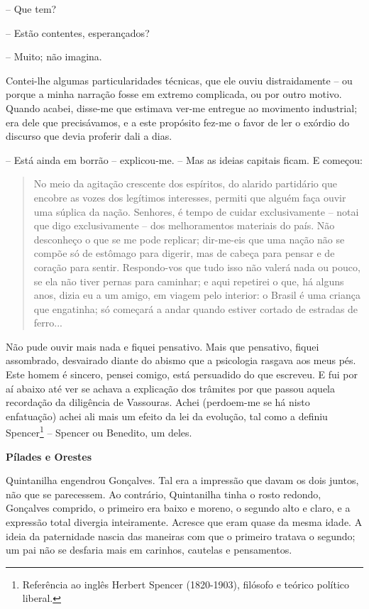 -- Que tem?

-- Estão contentes, esperançados?

-- Muito; não imagina.

Contei-lhe algumas particularidades técnicas, que ele ouviu
distraidamente -- ou porque a minha narração fosse em extremo
complicada, ou por outro motivo. Quando acabei, disse-me que estimava
ver-me entregue ao movimento industrial; era dele que precisávamos, e a
este propósito fez-me o favor de ler o exórdio do discurso que devia
proferir dali a dias.

-- Está ainda em borrão -- explicou-me. -- Mas as ideias capitais ficam.
E começou:

\begin{quote}
No meio da agitação crescente dos espíritos, do alarido partidário que
encobre as vozes dos legítimos interesses, permiti que alguém faça ouvir
uma súplica da nação. Senhores, é tempo de cuidar exclusivamente --
notai que digo exclusivamente -- dos melhoramentos materiais do país.
Não desconheço o que se me pode replicar; dir-me-eis que uma nação não
se compõe só de estômago para digerir, mas de cabeça para pensar e de
coração para sentir. Respondo-vos que tudo isso não valerá nada ou
pouco, se ela não tiver pernas para caminhar; e aqui repetirei o que, há
alguns anos, dizia eu a um amigo, em viagem pelo interior: o Brasil é
uma criança que engatinha; só começará a andar quando estiver cortado de
estradas de ferro...
\end{quote}

Não pude ouvir mais nada e fiquei pensativo. Mais que pensativo, fiquei
assombrado, desvairado diante do abismo que a psicologia rasgava aos
meus pés. Este homem é sincero, pensei comigo, está persuadido do que
escreveu. E fui por aí abaixo até ver se achava a explicação dos
trâmites por que passou aquela recordação da diligência de Vassouras.
Achei (perdoem-me se há nisto enfatuação) achei ali mais um efeito da
lei da evolução, tal como a definiu Spencer\footnote{Referência ao
  inglês Herbert Spencer (1820-1903), filósofo e teórico político
  liberal.} -- Spencer ou Benedito, um deles.

\textbf{Pílades e Orestes}

Quintanilha engendrou Gonçalves. Tal era a impressão que davam os dois
juntos, não que se parecessem. Ao contrário, Quintanilha tinha o rosto
redondo, Gonçalves comprido, o primeiro era baixo e moreno, o segundo
alto e claro, e a expressão total divergia inteiramente. Acresce que
eram quase da mesma idade. A ideia da paternidade nascia das maneiras
com que o primeiro tratava o segundo; um pai não se desfaria mais em
carinhos, cautelas e pensamentos.


